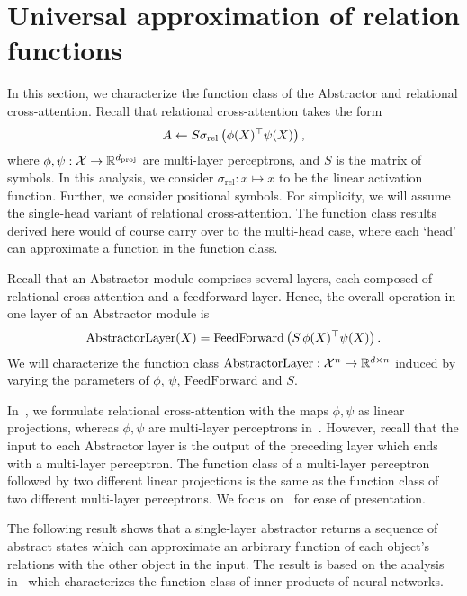 \section{Universal approximation of relation functions}\label{sec:abstractor_approx_theory}

In this section, we characterize the function class of the Abstractor and relational cross-attention. Recall that relational cross-attention takes the form
\begin{equation*}
    A \gets S \sigma_{\mathrm{rel}}\left(\phi(X)^\top \psi(X)\right),
\end{equation*}
where $\phi, \psi: {\mathcal{X}} \to \mathbb{R}^{d_{\mathrm{proj}}}$ are multi-layer perceptrons, and $S$ is the matrix of symbols. In this analysis, we consider $\sigma_{\mathrm{rel}}: x \mapsto x$ to be the linear activation function. Further, we consider positional symbols. For simplicity, we will assume the single-head variant of relational cross-attention. The function class results derived here would of course carry over to the multi-head case, where each `head' can approximate a function in the function class.

Recall that an Abstractor module comprises several layers, each composed of relational cross-attention and a feedforward layer. Hence, the overall operation in one layer of an Abstractor module is
\begin{equation}\label{eq:abstractor_layer}
    \mathrm{AbstractorLayer}(X) = \mathrm{FeedForward}\left(S\, \phi(X)^\top \psi(X)\right).
\end{equation}
We will characterize the function class $\mathrm{AbstractorLayer}: {\mathcal{X}}^n \to \mathbb{R}^{d \times n}$ induced by varying the parameters of $\phi,\, \psi,\, \mathrm{FeedForward}$ and $S$.

\begin{remark}
    In~, we formulate relational cross-attention with the maps $\phi, \psi$ as linear projections, whereas $\phi, \psi$ are multi-layer perceptrons in~. However, recall that the input to each Abstractor layer is the output of the preceding layer which ends with a multi-layer perceptron. The function class of a multi-layer perceptron followed by two different linear projections is the same as the function class of two different multi-layer perceptrons. We focus on~ for ease of presentation.
\end{remark}

The following result shows that a single-layer abstractor returns a sequence of abstract states which can approximate an arbitrary function of each object's relations with the other object in the input. The result is based on the analysis in~\citep{altabaaApproximationRelationFunctions2024} which characterizes the function class of inner products of neural networks.

